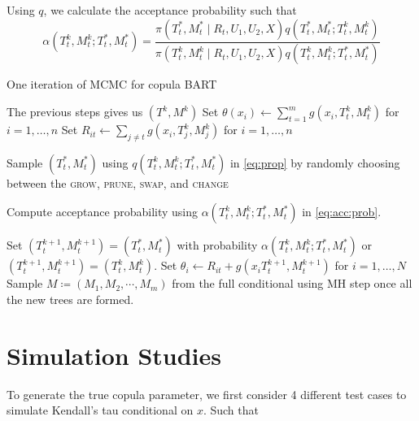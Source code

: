 \documentclass{amsart}
\begin{document}
Using $q$, we calculate the acceptance probability such that
\begin{equation}\label{eq:acc:prob}
	\alpha\left(T_t^k,M_t^k;T_t^\ast, M_t^\ast\right)
	= \frac{\pi(T_t^\ast,M_t^\ast \mid R_t, U_1, U_2, X)q\left(T_t^\ast, M_t^\ast;T_t^k,M_t^k\right)}
	{\pi(T_t^k,M_t^k \mid R_t, U_1, U_2, X)q\left(T_t^k,M_t^k;T_t^\ast, M_t^\ast\right)}
\end{equation}

\begin{algorithm}
	\caption{One iteration of MCMC for copula BART}
	
	\begin{algorithmic}[1]
		\State The previous steps gives us $(T^k,M^k)$
		\State Set $\theta(x_i) \leftarrow \sum_{t=1}^{m} g(x_i, T^k_t, M^k_t)$ for $i = 1, \ldots, n$
		\State Set $R_{it} \leftarrow \sum_{j\not=t}g(x_i, T_j^k, M_j^k)$ for $i = 1, \ldots, n$
		
		\State Sample $(T_t^\ast, M_t^\ast)$ using $q\left(T_t^k,M_t^k;T_t^\ast, M_t^\ast\right)$ in \cref{eq:prop} by randomly choosing between the \textsc{grow}, \textsc{prune}, \textsc{swap}, and \textsc{change} 
		
		\State Compute acceptance probability using $\alpha\left(T_t^k,M_t^k;T_t^\ast, M_t^\ast\right)$ in \cref{eq:acc:prob}.
		
		\State Set $(T_t^{k+1}, M_t^{k+1})=(T_t^\ast, M_t^\ast)$ with probability $\alpha\left(T_t^k,M_t^k;T_t^\ast, M_t^\ast\right)$ or $(T_t^{k+1}, M_t^{k+1})=(T_t^k,M_t^k)$.
		\State Set $\theta_i \leftarrow R_{it} + g(x_i T_t^{k+1}, M_t^{k+1})$ for $i = 1, \ldots, N$
		\EndFor
        \State Sample $M\coloneqq (M_1, M_2, \cdots, M_m)$ from the full conditional using MH step once all the new trees are formed.
	\end{algorithmic}
\end{algorithm}

\section{Simulation Studies}

To generate the true copula parameter, we first consider 4 different test cases to simulate Kendall's tau conditional on $x$. Such that
\end{document}
